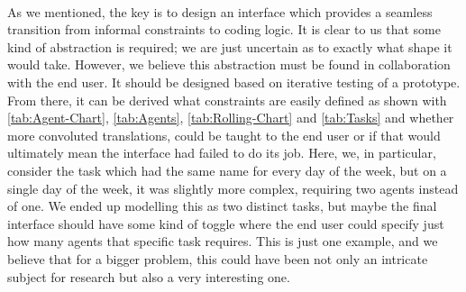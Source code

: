 \\
As we mentioned, the key is to design an interface which provides a seamless transition from informal constraints to coding logic. It is clear to us that some kind of abstraction is required; we are just uncertain as to exactly what shape it would take. However, we believe this abstraction must be found in collaboration with the end user. It should be designed based on iterative testing of a prototype. From there, it can be derived what constraints are easily defined as shown with \autoref{tab:Agent-Chart}, \autoref{tab:Agents}, \autoref{tab:Rolling-Chart} and \autoref{tab:Tasks} and whether more convoluted translations, could be taught to the end user or if that would ultimately mean the interface had failed to do its job. Here, we, in particular, consider the task which had the same name for every day of the week, but on a single day of the week, it was slightly more complex, requiring two agents instead of one. We ended up modelling this as two distinct tasks, but maybe the final interface should have some kind of toggle where the end user could specify just how many agents that specific task requires. This is just one example, and we believe that for a bigger problem, this could have been not only an intricate subject for research but also a very interesting one.